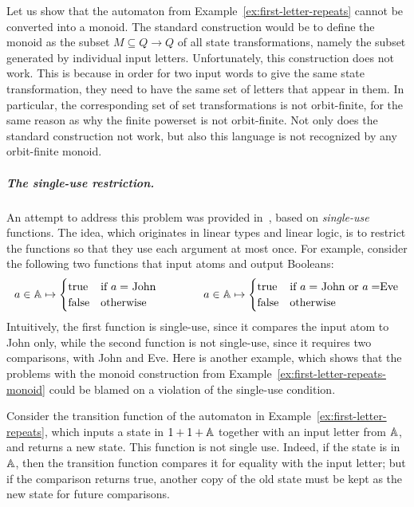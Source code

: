 \documentclass[a4paper,UKenglish,cleveref, autoref, thm-restate]{lipics-v2021}
\begin{document}
\begin{example}\label{ex:first-letter-repeats-monoid}
    Let us show that the  automaton from Example~\ref{ex:first-letter-repeats} cannot be converted into a monoid. The standard construction would be to define the monoid as the subset $M \subseteq Q \to Q$ of all state transformations, namely the subset generated by individual input letters. 
    Unfortunately, this construction does not work. This is because in order  for  two input words to give the same state transformation, they need to have the same set of letters that appear in them. In particular, the corresponding set of set transformations is not orbit-finite, for the same reason as why the finite powerset is not orbit-finite. Not only does the standard construction not work, but also this language is not recognized by any orbit-finite monoid.\exampleend
\end{example}

\subparagraph{The single-use restriction.}
An attempt to address this problem was provided in~\cite{stefanski-phd,bojanczykstefanski2020}, based on \emph{single-use} functions. The idea, which originates in linear types and linear logic,  is to restrict the functions so that they use each argument at most once. For example, consider the following two functions that input atoms and output Booleans:
\begin{align*}
a \in \mathbb A \mapsto 
\begin{cases}
    \text{true} & \text{if $a=$ John}\\
    \text{false} & \text{otherwise}
\end{cases}
\qquad \qquad 
a \in \mathbb A \mapsto 
\begin{cases}
    \text{true} & \text{if $a=$ John or $a = $Eve}\\
    \text{false} & \text{otherwise}
\end{cases}
\end{align*}
Intuitively, the first function is single-use, since it compares the input atom to John only, while the second function is not single-use, since it requires two comparisons, with John and Eve. Here is another example, which shows that the problems with the monoid construction from Example~\ref{ex:first-letter-repeats-monoid} could be blamed on a violation of the single-use condition.
\begin{example}
    Consider  the transition function of the automaton in Example~\ref{ex:first-letter-repeats}, which inputs a state in $1 + 1 + \mathbb A$ together with an input letter from $\mathbb A$, and returns a new state.  This function is not single use. Indeed, if the state is in $\mathbb A$, then the transition function compares it for equality with the input letter; but if the comparison returns true, another copy of the old state must be kept as the new state for future comparisons. \exampleend
\end{example}
\end{document}
